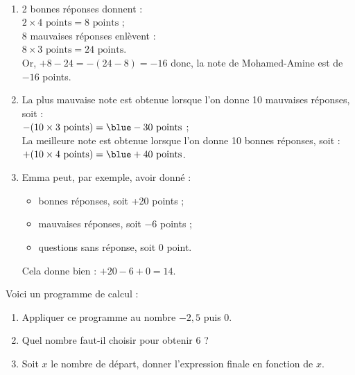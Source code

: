 \begin{colonne*exercice}
\begin{corrige}
   \ \\ [-5mm]
   \begin{enumerate}
      \item 2 bonnes réponses donnent  : \\
         $2\times4\text{ points} =8\text{ points}$ ; \\
         8 mauvaises réponses enlèvent : \\
         $8\times3\text{ points} =24\text{ points}$. \\
         Or, $+8-24 =-(24-8) =-16$ donc, la note de Mohamed-Amine est de {\blue $-16$ points}.
      \item La plus mauvaise note est obtenue lorsque l'on donne 10 mauvaises réponses, soit : \\
         $-(10\times3\text{ points}) =\blue -30\text{ points}$ ; \\
         La meilleure note est obtenue lorsque l'on donne 10 bonnes réponses, soit  : \\
         $+(10\times4\text{ points}) =\blue +40\text{ points}$. \\
      \item Emma peut, par exemple, avoir donné :
         \begin{itemize}
            \item { bonnes réponses}, soit +20 points ;
            \item { mauvaises réponses}, soit $-6$ points ; 
            \item { questions sans réponse}, soit 0 point.
         \end{itemize}
      Cela donne bien : $+20-6+0 =14$.
   \end{enumerate}
\end{corrige}

\medskip


\begin{exercice} %
   Voici un programme de calcul :
   \begin{center}
   \end{center}
   \begin{enumerate}
      \item Appliquer ce programme au nombre $-2,5$ puis 0.
      \item Quel nombre faut-il choisir pour obtenir 6 ?
      \item Soit $x$ le nombre de départ, donner l'expression finale en fonction de $x$.
   \end{enumerate}
\end{exercice}


\end{colonne*exercice}
